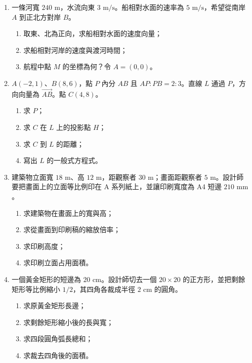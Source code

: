 \documentclass[11pt,a4paper]{article}
\providecommand{\tightlist}{%
  \setlength{\itemsep}{0pt}\setlength{\parskip}{0pt}}
\begin{document}
\begin{enumerate}
\def\labelenumi{\arabic{enumi}.}
\setcounter{enumi}{12}
\tightlist
\item
  一條河寬 \(240\text{ m}\)，水流向東 \(3\text{ m/s}\)。船相對水面的速率為 \(5\text{ m/s}\)，希望從南岸 \(A\) 到正北方對岸 \(B\)。

  \begin{enumerate}
  \def\labelenumii{\arabic{enumii}.}
  \tightlist
  \item
    取東、北為正向，求船相對水面的速度向量；
  \item
    求船相對河岸的速度與渡河時間；
  \item
    航程中點 \(M\) 的坐標為何？令 \(A=(0,0)\)。
  \end{enumerate}
\item
  \(A(-2,1)\)、\(B(8,6)\)，點 \(P\) 內分 \(AB\) 且 \(AP:PB=2:3\)。直線 \(L\) 通過 \(P\)，方向向量為 \(\overrightarrow{AB}\)。點 \(C(4,8)\)。

  \begin{enumerate}
  \def\labelenumii{\arabic{enumii}.}
  \tightlist
  \item
    求 \(P\)；
  \item
    求 \(C\) 在 \(L\) 上的投影點 \(H\)；
  \item
    求 \(C\) 到 \(L\) 的距離；
  \item
    寫出 \(L\) 的一般式方程式。
  \end{enumerate}
\item
  建築物立面寬 \(18\text{ m}\)、高 \(12\text{ m}\)，距觀察者 \(30\text{ m}\)；畫面距觀察者 \(5\text{ m}\)。設計師要把畫面上的立面等比例印在 A 系列紙上，並讓印刷寬度為 A4 短邊 \(210\text{ mm}\)。

  \begin{enumerate}
  \def\labelenumii{\arabic{enumii}.}
  \tightlist
  \item
    求建築物在畫面上的寬與高；
  \item
    求從畫面到印刷稿的縮放倍率；
  \item
    求印刷高度；
  \item
    求印刷立面占用面積。
  \end{enumerate}
\item
  一個黃金矩形的短邊為 \(20\text{ cm}\)。設計師切去一個 \(20\times20\) 的正方形，並把剩餘矩形等比例縮小 \(1/2\)，其四角各裁成半徑 \(2\text{ cm}\) 的圓角。

  \begin{enumerate}
  \def\labelenumii{\arabic{enumii}.}
  \tightlist
  \item
    求原黃金矩形長邊；
  \item
    求剩餘矩形縮小後的長與寬；
  \item
    求四段圓角弧長總和；
  \item
    求裁去四角後的面積。
  \end{enumerate}
\end{enumerate}
\end{document}

